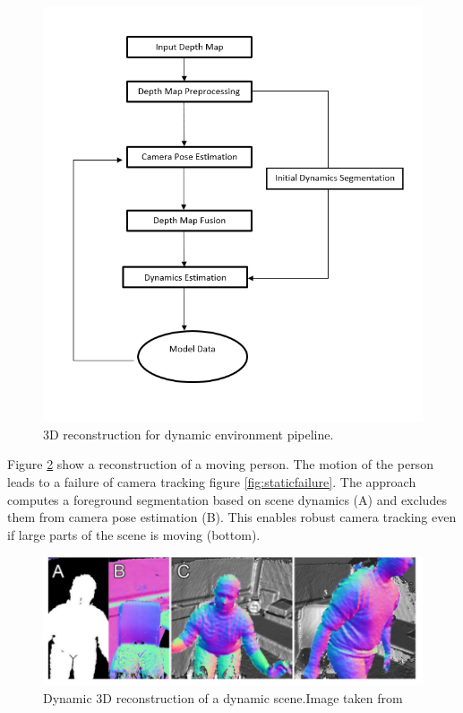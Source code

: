 \begin{figure}[h]
    \centering
    \includegraphics[scale=0.4]{images/DynamicRecon.png}
    \caption{3D reconstruction for dynamic environment pipeline.}
    \label{fig:dynamic}
\end{figure}

Figure \ref{fig:dynamicscene} show a reconstruction of a moving person. The motion of the person leads to a failure of camera tracking figure \ref{fig:staticfailure}. The approach \cite{Keller:2013:RRD:2544744.2544784} computes a foreground segmentation based on scene dynamics (A) and excludes them from camera pose estimation (B). This enables robust camera tracking even if large parts of the scene is moving (bottom). 

\begin{figure}[h]
    \centering
    \includegraphics[scale=0.5]{images/Dynamic_rec.PNG}
    \caption{Dynamic 3D reconstruction of a dynamic scene.Image taken from \cite{Keller:2013:RRD:2544744.2544784} }
    \label{fig:dynamicscene}
\end{figure}\\


